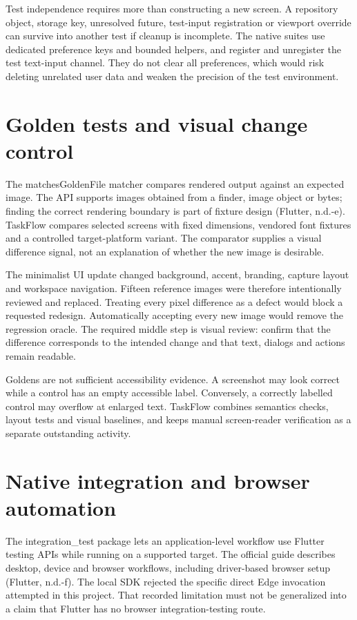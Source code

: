 \documentclass[12pt,a4paper,oneside]{report}
\begin{document}
Test independence requires more than constructing a new screen. A repository object, storage key, unresolved future, test-input registration or viewport override can survive into another test if cleanup is incomplete. The native suites use dedicated preference keys and bounded helpers, and register and unregister the test text-input channel. They do not clear all preferences, which would risk deleting unrelated user data and weaken the precision of the test environment.

\section{Golden tests and visual change control}
The matchesGoldenFile matcher compares rendered output against an expected image. The API supports images obtained from a finder, image object or bytes; finding the correct rendering boundary is part of fixture design (Flutter, n.d.-e). TaskFlow compares selected screens with fixed dimensions, vendored font fixtures and a controlled target-platform variant. The comparator supplies a visual difference signal, not an explanation of whether the new image is desirable.

The minimalist UI update changed background, accent, branding, capture layout and workspace navigation. Fifteen reference images were therefore intentionally reviewed and replaced. Treating every pixel difference as a defect would block a requested redesign. Automatically accepting every new image would remove the regression oracle. The required middle step is visual review: confirm that the difference corresponds to the intended change and that text, dialogs and actions remain readable.

Goldens are not sufficient accessibility evidence. A screenshot may look correct while a control has an empty accessible label. Conversely, a correctly labelled control may overflow at enlarged text. TaskFlow combines semantics checks, layout tests and visual baselines, and keeps manual screen-reader verification as a separate outstanding activity.

\section{Native integration and browser automation}
The integration\_test package lets an application-level workflow use Flutter testing APIs while running on a supported target. The official guide describes desktop, device and browser workflows, including driver-based browser setup (Flutter, n.d.-f). The local SDK rejected the specific direct Edge invocation attempted in this project. That recorded limitation must not be generalized into a claim that Flutter has no browser integration-testing route.
\end{document}
